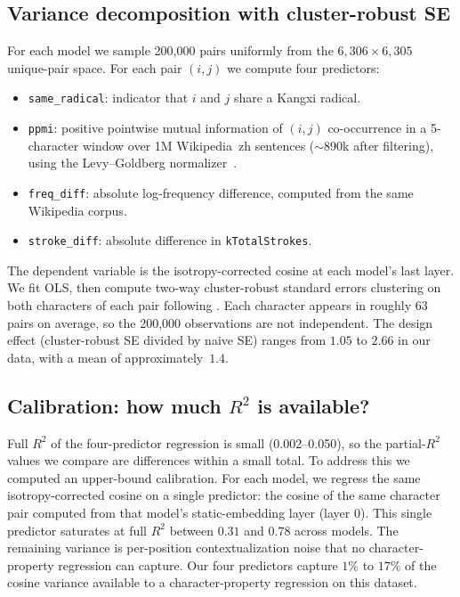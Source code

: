 \documentclass[11pt,a4paper,twocolumn]{article}
\begin{document}
\subsection{Variance decomposition with cluster-robust SE}
\label{sec:varianceDecomp}
For each model we sample 200{,}000 pairs uniformly from the
$6{,}306 \times 6{,}305$ unique-pair space. For each pair $(i, j)$ we
compute four predictors:
\begin{itemize}[leftmargin=1.2em,topsep=2pt,itemsep=1pt,parsep=0pt]
  \item \texttt{same\_radical}: indicator that $i$ and $j$ share a
    Kangxi radical.
  \item \texttt{ppmi}: positive pointwise mutual information of $(i, j)$
    co-occurrence in a 5-character window over 1M Wikipedia~zh
    sentences ($\sim$890k after filtering), using the Levy--Goldberg
    normalizer~\cite{LevyGoldberg2014}.
  \item \texttt{freq\_diff}: absolute log-frequency difference,
    computed from the same Wikipedia corpus.
  \item \texttt{stroke\_diff}: absolute difference in
    \texttt{kTotalStrokes}.
\end{itemize}

The dependent variable is the isotropy-corrected cosine at each model's
last layer. We fit OLS, then compute two-way cluster-robust standard
errors clustering on both characters of each pair following
\cite{CameronGelbachMiller2011}. Each character appears in roughly 63
pairs on average, so the 200{,}000 observations are not independent.
The design effect (cluster-robust SE divided by naive SE) ranges from
$1.05$ to $2.66$ in our data, with a mean of approximately~$1.4$.

\subsection{Calibration: how much $R^2$ is available?}
Full $R^2$ of the four-predictor regression is small (0.002--0.050),
so the partial-$R^2$ values we compare are differences within a small
total. To address this we computed an upper-bound calibration. For
each model, we regress the same isotropy-corrected cosine on a single
predictor: the cosine of the same character pair computed from that
model's static-embedding layer (layer 0). This single predictor
saturates at full $R^2$ between $0.31$ and $0.78$ across models. The
remaining variance is per-position contextualization noise that no
character-property regression can capture. Our four predictors capture
$1\%$ to $17\%$ of the cosine variance available to a
character-property regression on this dataset.
\end{document}
